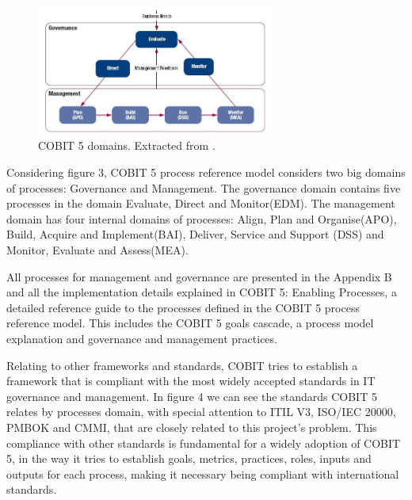 \begin{figure}
\centering
\includegraphics[width=0.7\textwidth]{img/COBITProcesses.jpg}
\caption{COBIT 5 domains. Extracted from \cite{2012cobit}.}
\end{figure}

Considering figure 3, COBIT 5 process reference model considers two big domains of processes: Governance and Management. The governance domain contains five processes in the domain Evaluate, Direct and Monitor(EDM). The management domain has four internal domains of processes: Align, Plan and Organise(APO), Build, Acquire and Implement(BAI), Deliver, Service and Support (DSS) and Monitor, Evaluate and Assess(MEA).\par
All processes for management and governance are presented in the Appendix B and all the implementation details explained in COBIT 5: Enabling Processes\cite{2012cobitEP}, a detailed reference guide to the processes defined in the COBIT 5 process reference model. This includes the COBIT 5 goals cascade, a process model explanation and governance and management practices.\par
Relating to other frameworks and standards, COBIT tries to establish a framework that is compliant with the most widely accepted standards in IT governance and management. In figure 4 we can see the standards COBIT 5 relates by processes domain, with special attention to ITIL V3\cite{itilSS,itilSD,itilSO,itilST,itilCSI}, ISO/IEC 20000\cite{ISO20000-1}, PMBOK\cite{pmbok5} and CMMI\cite{cmmi}, that are closely related to this project's problem. This compliance with other standards is fundamental for a widely adoption of COBIT 5, in the way it tries to establish goals, metrics, practices, roles, inputs and outputs for each process, making it necessary being compliant with international standards.\par

